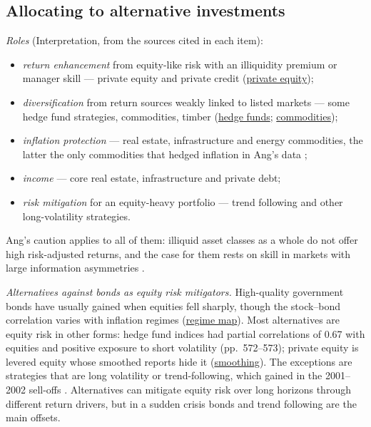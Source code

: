 \subsection{Allocating to alternative investments}

\begin{qfdefinition}\label{def:alternatives-roles-opportunity-set}
 \emph{Roles} (Interpretation, from the sources cited in each item):
\begin{itemize}
\item \emph{return enhancement} from equity-like risk with an illiquidity premium or manager skill --- private equity and private credit (\hyperref[def:private-equity-features]{private equity});
\item \emph{diversification} from return sources weakly linked to listed markets --- some hedge fund strategies, commodities, timber (\hyperref[def:hedge-fund-features]{hedge funds}; \hyperref[def:commodity-features]{commodities});
\item \emph{inflation protection} --- real estate, infrastructure and energy commodities, the latter the only commodities that hedged inflation in Ang's data \citep[pp.~366--367]{s7-ang};
\item \emph{income} --- core real estate, infrastructure and private debt;
\item \emph{risk mitigation} for an equity-heavy portfolio --- trend following and other long-volatility strategies.
\end{itemize}
Ang's caution applies to all of them: illiquid asset classes as a whole do not offer high risk-adjusted returns, and the case for them rests on skill in markets with large information asymmetries \citep[pp.~438--439]{s7-ang}.

\emph{Alternatives against bonds as equity risk mitigators.} High-quality government bonds have usually gained when equities fell sharply, though the stock--bond correlation varies with inflation regimes (\hyperref[def:macro-regime-asset-map]{regime map}). Most alternatives are equity risk in other forms: hedge fund indices had partial correlations of 0.67 with equities and positive exposure to short volatility (pp.~572--573); private equity is levered equity whose smoothed reports hide it (\hyperref[meth:private-capital-diversification]{smoothing}). The exceptions are strategies that are long volatility or trend-following, which gained in the 2001--2002 sell-offs \citep[p.~107]{jaeger-alternative-beta-2008}. Alternatives can mitigate equity risk over long horizons through different return drivers, but in a sudden crisis bonds and trend following are the main offsets.


\end{qfdefinition}
